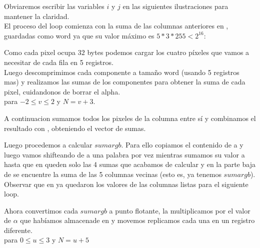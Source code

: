 Obviaremos escribir las variables $i$ y $j$ en las siguientes ilustraciones para mantener la claridad. \\

El proceso del loop comienza con la suma de las columnas anteriores en , guardadas como word ya que su valor máximo es $5 * 3 * 255 < 2^{16}$: \\

 

Como cada pixel ocupa $32$ bytes podemos cargar los cuatro píxeles que vamos a necesitar de cada fila en 5 registros. \\
Luego descomprimimos cada componente a tamaño word (usando 5 registros mas) y realizamos las sumas de los componentes para obtener la suma de cada pixel, cuidandonos de borrar el alpha. \\

  para $-2 \le v \le 2$ y $N = v+3$.

A continuacion sumamos todos los pixeles de la columna entre sí y combinamos el resultado con , obteniendo el vector de sumas. \\

 

Luego procedemos a calcular $sumargb$. Para ello copiamos el contenido de  a  y luego vamos shifteando  de a una palabra por vez mientras sumamos su valor a  hasta que en  queden solo las 4 sumas que acabamos de calcular y en la parte baja de  se encuentre la suma de las 5 columnas vecinas (esto es, ya tenemos $sumargb$). \\
Observar que en  ya quedaron los valores de las columnas listas para el siguiente loop. \\

 

 

Ahora convertimos cada $sumargb$ a punto flotante, la multiplicamos por el valor de $\alpha$ que habíamos almacenade en  y movemos replicamos cada una en un registro diferente. \\

 
para $0 \le u \le 3$ y $N = u+5$

